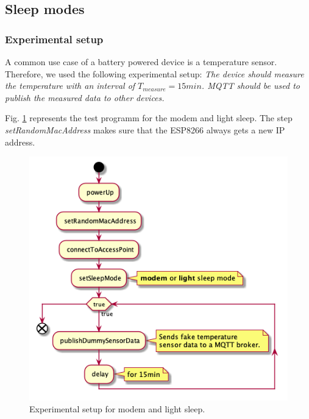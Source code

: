 \subsection{Sleep modes}

\subsubsection{Experimental setup}
A common use case of a battery powered device is a temperature sensor.
Therefore, we used the following experimental setup:
\textit{The device should measure the temperature with an interval of $T_{measure} = 15min$.
MQTT should be used to publish the measured data to other devices.}

Fig. \ref{fig:experiment_modem_light_sleep} represents the test programm for the modem and light sleep.
The step \textit{setRandomMacAddress} makes sure that the ESP8266 always gets a new IP address.

\begin{figure}[h]
    \centering
    \includegraphics[width = 0.7 \linewidth]{fig/sequence_modem_light_sleep.png}
    \caption{Experimental setup for modem and light sleep.}
    \label{fig:experiment_modem_light_sleep}
\end{figure}

